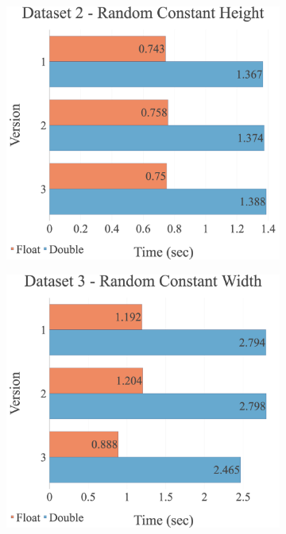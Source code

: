 \begin{figure}[H]
\begin{adjustwidth}{-2cm}{-2cm}
\begin{subfigure}{.62\textwidth}
\end{subfigure}
\par\bigskip
\par\bigskip
\begin{subfigure}{.62\textwidth}
  \centering
  \includegraphics[width=1\textwidth]{img/experiments/multi-versions-2_RANDCONSTHEIGHT.png}
\end{subfigure}
\begin{subfigure}{.62\textwidth}
  \centering
  \includegraphics[width=1\textwidth]{img/experiments/multi-versions-3_RANDCONSTWIDTH.png}
\end{subfigure}
\end{adjustwidth}
\end{figure}

